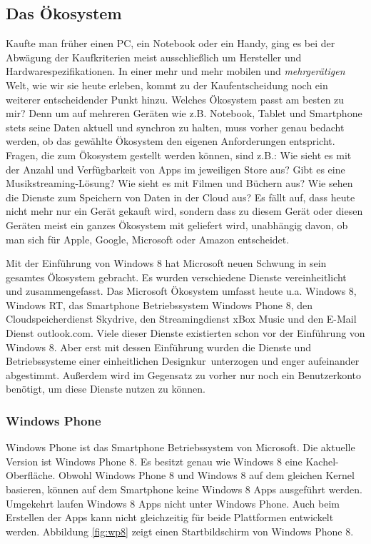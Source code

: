 \documentclass[12pt,a4paper,bibtotoc,abstracton]{scrartcl}
\begin{document}
\subsection{Das Ökosystem}
\label{subsec:ökosystem}
Kaufte man früher einen PC, ein Notebook oder ein Handy, ging es bei der Abwägung der Kaufkriterien meist ausschließlich um Hersteller und Hardwarespezifikationen. In einer mehr und mehr mobilen und \textit{mehrgerätigen} Welt, wie wir sie heute erleben, kommt zu der Kaufentscheidung noch ein weiterer entscheidender Punkt hinzu. Welches Ökosystem passt am besten zu mir? Denn um auf mehreren Geräten wie z.B. Notebook, Tablet und Smartphone stets seine Daten aktuell und synchron zu halten, muss vorher genau bedacht werden, ob das gewählte Ökosystem den eigenen Anforderungen entspricht. Fragen, die zum  Ökosystem gestellt werden können, sind z.B.: Wie sieht es mit der Anzahl und Verfügbarkeit von Apps im jeweiligen Store aus? Gibt es eine Musikstreaming-Lösung? Wie sieht es mit Filmen und Büchern aus? Wie sehen die Dienste zum Speichern von Daten in der Cloud aus? Es fällt auf, dass heute nicht mehr nur ein Gerät gekauft wird, sondern dass zu diesem Gerät oder diesen Geräten meist ein ganzes Ökosystem mit geliefert wird, unabhängig davon, ob man sich für Apple, Google, Microsoft oder Amazon entscheidet. 

Mit der Einführung von Windows 8 hat Microsoft neuen Schwung in sein gesamtes Ökosystem gebracht. Es wurden verschiedene Dienste vereinheitlicht und zusammengefasst. Das Microsoft Ökosystem umfasst heute u.a. Windows 8, Windows RT, das Smartphone Betriebssystem Windows Phone 8, den Cloudspeicherdienst Skydrive, den Streamingdienst xBox Music und den E-Mail Dienst outlook.com. Viele dieser Dienste existierten schon vor der Einführung von Windows 8. Aber erst mit dessen Einführung wurden die Dienste und Betriebssysteme einer einheitlichen \glqq Designkur\grqq\ unterzogen und enger aufeinander abgestimmt. Außerdem wird im Gegensatz zu vorher nur noch ein Benutzerkonto benötigt, um diese Dienste nutzen zu können.

\subsubsection{Windows Phone}
\label{subsubsec:windowsphone}
Windows Phone ist das Smartphone Betriebssystem von Microsoft. Die aktuelle Version ist Windows Phone 8. Es besitzt genau wie Windows 8 eine Kachel-Oberfläche. Obwohl Windows Phone 8 und Windows 8 auf dem gleichen Kernel basieren, können auf dem Smartphone keine Windows 8 Apps ausgeführt werden. Umgekehrt laufen Windows 8 Apps nicht unter Windows Phone. Auch beim Erstellen der Apps kann nicht gleichzeitig für beide Plattformen entwickelt werden. Abbildung \ref{fig:wp8} zeigt einen Startbildschirm von Windows Phone 8.
\end{document}
